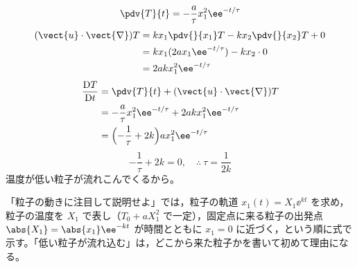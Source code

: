 \[ \pdv{T}{t}=-\frac{a}{\tau}x_{1}^{2}\ee^{-t/\tau} \]
\begin{align*}
(\vect{u}\cdot\vect{\nabla})T&=kx_{1}\pdv{}{x_{1}}T-kx_{2}\pdv{}{x_{2}}T+0\\
&=kx_{1}(2ax_{1}\ee^{-t/\tau})-kx_{2}\cdot0\\
&=2akx_{1}^{2}\ee^{-t/\tau}
\end{align*}
\begin{align*}
\frac{\mathrm{D}T}{\mathrm{D}t}&=\pdv{T}{t}+(\vect{u}\cdot\vect{\nabla})T\\
&=-\frac{a}{\tau}x_{1}^{2}\ee^{-t/\tau}+2akx_{1}^{2}\ee^{-t/\tau}\\
&=\Bigl(-\frac{1}{\tau}+2k\Bigr)ax_{1}^{2}\ee^{-t/\tau}
\end{align*}
\[ -\frac{1}{\tau}+2k=0,\quad \therefore\ \tau=\frac{1}{2k} \]
温度が低い粒子が流れこんでくるから。
\item 「粒子の動きに注目して説明せよ」では，粒子の軌道 $x_{1}(t)=X_{1}\ee^{kt}$ を求め，粒子の温度を $X_{1}$ で表し（$T_{0}+aX_{1}^{2}$ で一定），固定点に来る粒子の出発点 $\abs{X_{1}}=\abs{x_{1}}\ee^{-kt}$ が時間とともに $x_{1}=0$ に近づく，という順に式で示す。「低い粒子が流れ込む」は，どこから来た粒子かを書いて初めて理由になる。
